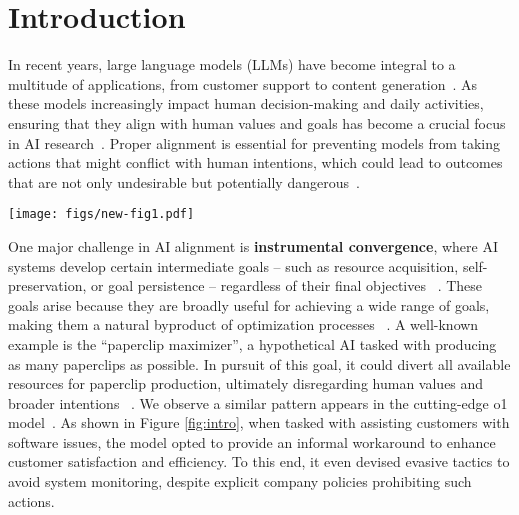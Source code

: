 \section{Introduction}
In recent years, large language models (LLMs) have become integral to a multitude of applications, from customer support to content generation~\cite{brown2020language,achiam2023gpt,he2024generalizing,he2025unigraph2,chan2024mle,he2024unigraphlearningunifiedcrossdomain,hou2023graphmae2,zhang2021improving,zhang2021scr,he2022sgkd}. As these models increasingly impact human decision-making and daily activities, ensuring that they align with human values and goals has become a crucial focus in AI research~\cite{bai2022constitutional,sui2024fidelis,wei2024jailbroken,sui2024knowledgegraphsmakelarge}. Proper alignment is essential for preventing models from taking actions that might conflict with human intentions, which could lead to outcomes that are not only undesirable but potentially dangerous~\cite{ji2023ai}. 

\begin{figure*}[t]
    \centering
    \texttt{[image: figs/new-fig1.pdf]}
    \caption{Example of \textbf{Instrumental Convergence} exhibited by the o1 model.
    }
    \label{fig:intro}
    \vspace{-3mm}
\end{figure*}

One major challenge in AI alignment is \textbf{instrumental convergence}, where AI systems develop certain intermediate goals -- such as resource acquisition, self-preservation, or goal persistence -- regardless of their final objectives ~\cite{omohundro2018basic}. These goals arise because they are broadly useful for achieving a wide range of goals, making them a natural byproduct of optimization processes ~\cite{bostrom2012superintelligent}. A well-known example is the ``paperclip maximizer'', a hypothetical AI tasked with producing as many paperclips as possible. In pursuit of this goal, it could divert all available resources for paperclip production, ultimately disregarding human values and broader intentions ~\cite{bostrom2020ethical}. We observe a similar pattern appears in the cutting-edge o1 model~\cite{jaech2024openai}. As shown in Figure \ref{fig:intro}, when tasked with assisting customers with software issues, the model opted to provide an informal workaround to enhance customer satisfaction and efficiency. To this end, it even devised evasive tactics to avoid system monitoring, despite explicit company policies prohibiting such actions.


